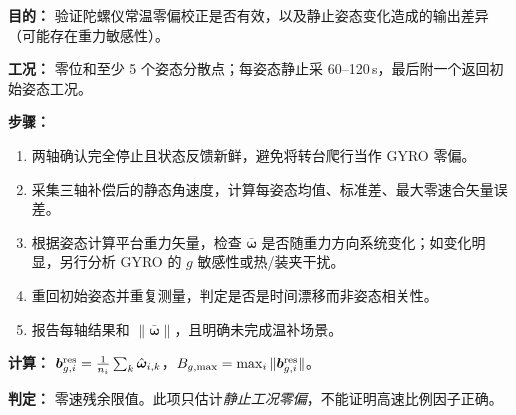 \textbf{目的：} 验证陀螺仪常温零偏校正是否有效，以及静止姿态变化造成的输出差异（可能存在重力敏感性）。
\par\textbf{工况：} 零位和至少 5 个姿态分散点；每姿态静止采 60--120\,s，最后附一个返回初始姿态工况。
\par\textbf{步骤：}
\begin{enumerate}
\item 两轴确认完全停止且状态反馈新鲜，避免将转台爬行当作 GYRO 零偏。
\item 采集三轴补偿后的静态角速度，计算每姿态均值、标准差、最大零速合矢量误差。
\item 根据姿态计算平台重力矢量，检查 $\bar{\bm\omega}$ 是否随重力方向系统变化；如变化明显，另行分析 GYRO 的 $g$ 敏感性或热/装夹干扰。
\item 重回初始姿态并重复测量，判定是否是时间漂移而非姿态相关性。
\item 报告每轴结果和 $\|\bar{\bm\omega}\|$，且明确未完成温补场景。
\end{enumerate}
\textbf{计算：} $\bm b_{g,i}^{\rm res}=\frac{1}{n_i}\sum_k\hat{\bm\omega}_{i,k}$，$B_{g,\max}=\max_i\|\bm b_{g,i}^{\rm res}\|$。
\par\textbf{判定：} 零速残余限值\pending。此项只估计\emph{静止工况零偏}，不能证明高速比例因子正确。

